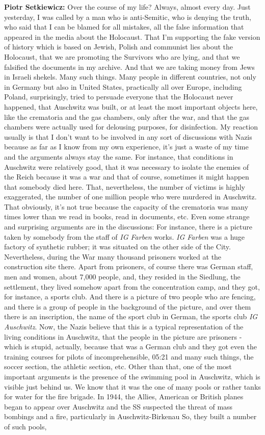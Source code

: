 \textbf{Piotr Setkiewicz:} Over the course of my life? Always, almost every day. Just yesterday, I was called by a man who is anti-Semitic, who is denying the truth, who said that I can be blamed for all mistakes, all the false information that appeared in the media about the Holocaust. That I'm supporting the fake version of history which is based on Jewish, Polish and communist lies about the Holocaust, that we are promoting the Survivors who are lying, and that we falsified the documents in my archive. And that we are taking money from Jews in Israeli shekels. Many such things. Many people in different countries, not only in Germany but also in United States, practically all over Europe, including Poland, surprisingly, tried to persuade everyone that the Holocaust never happened, that Auschwitz was built, or at least the most important objects here, like the crematoria and the gas chambers, only after the war, and that the gas chambers were actually used for delousing purposes, for disinfection. My reaction usually is that I don't want to be involved in any sort of discussions with Nazis because as far as I know from my own experience, it's just a waste of my time and the arguments always stay the same. For instance, that conditions in Auschwitz were relatively good, that it was necessary to isolate the enemies of the Reich because it was a war and that of course, sometimes it might happen that somebody died here. That, nevertheless, the number of victims is highly exaggerated, the number of one million people who were murdered in Auschwitz. That obviously, it's not true because the capacity of the crematoria was many times lower than we read in books, read in documents, etc. Even some strange and surprising arguments are in the discussions: For instance, there is a picture taken by somebody from the staff of \textit{IG Farben} works. \textit{IG Farben} was a huge factory of synthetic rubber; it was situated on the other side of the City. Nevertheless, during the War many thousand prisoners worked at the construction site there. Apart from prisoners, of course there was German staff, men and women, about 7,000 people, and, they resided in the Siedlung, the settlement, they lived somehow apart from the concentration camp, and they got, for instance, a sports club. And there is a picture of two people who are fencing, and there is a group of people in the background of the picture, and over them there is an inscription, the name of the sport club in German, the sports club \textit{IG Auschwitz}. Now, the Nazis believe that this is a typical representation of the living conditions in Auschwitz, that the people in the picture are prisoners - which is stupid, actually, because that was a German club and they got even the training courses for pilots of incomprehensible, 05:21 and many such things, the soccer section, the athletic section, etc. Other than that, one of the most important arguments is the presence of the swimming pool in Auschwitz, which is visible just behind us. We know that it was the one of many pools or rather tanks for water for the fire brigade. In 1944, the Allies, American or British planes began to appear over Auschwitz and the SS suspected the threat of mass bombings and a fire, particularly in Auschwitz-Birkenau So, they built a number of such pools, 
